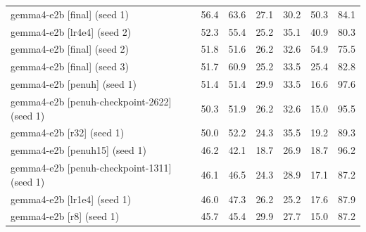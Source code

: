 \begin{table}[t]
\begin{tabular}{lrrrrrr}
gemma4-e2b [final] (seed 1) & 56.4 & 63.6 & 27.1 & 30.2 & 50.3 & 84.1 \\
gemma4-e2b [lr4e4] (seed 2) & 52.3 & 55.4 & 25.2 & 35.1 & 40.9 & 80.3 \\
gemma4-e2b [final] (seed 2) & 51.8 & 51.6 & 26.2 & 32.6 & 54.9 & 75.5 \\
gemma4-e2b [final] (seed 3) & 51.7 & 60.9 & 25.2 & 33.5 & 25.4 & 82.8 \\
gemma4-e2b [penuh] (seed 1) & 51.4 & 51.4 & 29.9 & 33.5 & 16.6 & 97.6 \\
gemma4-e2b [penuh-checkpoint-2622] (seed 1) & 50.3 & 51.9 & 26.2 & 32.6 & 15.0 & 95.5 \\
gemma4-e2b [r32] (seed 1) & 50.0 & 52.2 & 24.3 & 35.5 & 19.2 & 89.3 \\
gemma4-e2b [penuh15] (seed 1) & 46.2 & 42.1 & 18.7 & 26.9 & 18.7 & 96.2 \\
gemma4-e2b [penuh-checkpoint-1311] (seed 1) & 46.1 & 46.5 & 24.3 & 28.9 & 17.1 & 87.2 \\
gemma4-e2b [lr1e4] (seed 1) & 46.0 & 47.3 & 26.2 & 25.2 & 17.6 & 87.9 \\
gemma4-e2b [r8] (seed 1) & 45.7 & 45.4 & 29.9 & 27.7 & 15.0 & 87.2 \\
\bottomrule
\end{tabular}
\end{table}
